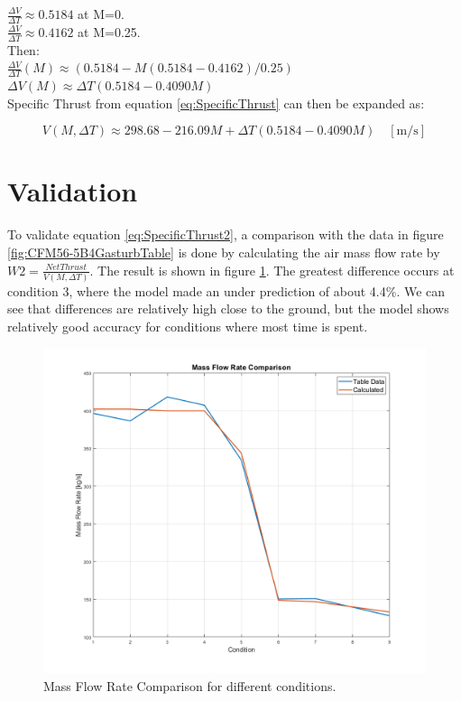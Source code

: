 \documentclass[english]{kththesis}
\begin{document}
$\frac{\Delta V}{\Delta T} \approx 0.5184 $ at M=0.\\

$\frac{\Delta V}{\Delta T} \approx 0.4162 $ at M=0.25.\\

Then:\\

$\frac{\Delta V}{\Delta T}(M) \approx (0.5184 - M (0.5184-0.4162)/0.25)$\\

$\Delta V(M) \approx  \Delta T (0.5184 - 0.4090M)$\\

Specific Thrust from equation \ref{eq:SpecificThrust} can then be expanded as:

\begin{equation}
\label{eq:SpecificThrust2}
V(M,\Delta T) \approx 298.68 - 216.09M + \Delta T (0.5184 - 0.4090M) \quad \mathrm{[m/s]}
\end{equation}


\section{Validation}
To validate equation \ref{eq:SpecificThrust2}, a comparison with the data in figure \ref{fig:CFM56-5B4GasturbTable} is done by calculating the air mass flow rate by $W2 = \frac{Net Thrust}{V(M,\Delta T)} $. The result is shown in figure \ref{fig:MassFlowRateComparison}. The greatest difference occurs at condition 3, where the model made an under prediction of about 4.4\%. We can see that differences are relatively high close to the ground, but the model shows relatively good accuracy for conditions where most time is spent.

\begin{figure}[hb]
    \centering
    \includegraphics[width=1\textwidth]{Epictures/MassFlowRateComparison.png}
    \caption{Mass Flow Rate Comparison for different conditions.}
    \label{fig:MassFlowRateComparison}
\end{figure}
\end{document}
